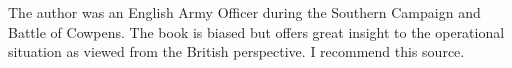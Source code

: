 The author was an English Army Officer during the Southern Campaign and Battle
of Cowpens.  The book is biased but offers great insight to the operational
situation as viewed from the British perspective.  I recommend this source. 
